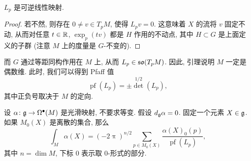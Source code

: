 \begin{lemma} \label{lem-12-lp-invert}
    $L_p$ 是可逆线性映射.
\end{lemma}

\begin{proof}
    若不然, 则存在 $0 \neq v \in T_p M$, 使得 $L_p v = 0$.
    这意味着 $X$ 的流将 $v$ 固定不动, 从而对任意 $t \in \mathbb{R}$,
    $\exp_p (tv)$ 都是 $H$ 作用的不动点, 其中 $H \subset G$ 是上面定义的子群
    (注意 $M$ 上的度量是 $G$-不变的).
\end{proof}

而 $G$ 通过等距同构作用在 $M$ 上, 从而 $L_p \in \mathfrak{so} (T_p M)$.
因此, 引理说明 $M$ 一定是偶数维. 此时, 我们可以得到 Pfaff 值
\[ \operatorname{pf} (L_p) = \pm \det^{1/2} (L_p), \]
其中正负号取决于 $M$ 的定向.

\begin{theorem} 
    设 $\alpha \colon \mathfrak{g} \to \Omega^\bullet (M)$ 是光滑映射, 不要求等变.
    假设 $d_{\mathfrak{g}} \alpha = 0$. 固定一个元素 $X \in \mathfrak{g}$. 
    如果 $M_0 (X)$ 是离散的集合, 那么
    \[ \int_M \alpha (X) = (-2 \uppi)^{n/2} \sum_{p \in M_0 (X)}
        \frac {\alpha(X)_0 (p)} {\operatorname{pf} (L_p)}, \]
    其中 $n = \dim M$, 下标 $0$ 表示取 $0$-形式的部分.
\end{theorem}

